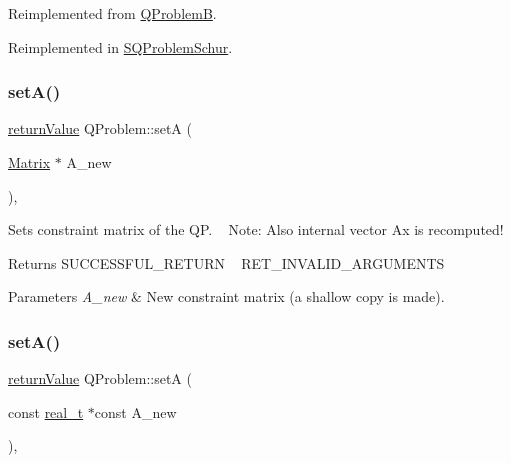 Reimplemented from \hyperlink{class_q_problem_b_a975c13e1a8fbe8c3e9c4dfbce9dc9a71}{Q\+ProblemB}.



Reimplemented in \hyperlink{class_s_q_problem_schur_afe4cfa0c10427b11515ec5a96f883284}{S\+Q\+Problem\+Schur}.

\mbox{\label{class_q_problem_afd392ee6cbfa4dd00d4941c51939e777}} 
\subsubsection{\texorpdfstring{set\+A()}{setA()}\hspace{0.1cm}{\footnotesize\ttfamily [1/2]}}
{\footnotesize\ttfamily \hyperlink{_message_handling_8hpp_a81d556f613bfbabd0b1f9488c0fa865e}{return\+Value} Q\+Problem\+::setA (\begin{DoxyParamCaption}\item[{\hyperlink{class_matrix}{Matrix} $\ast$}]{A\+\_\+new }\end{DoxyParamCaption})\hspace{0.3cm}{\ttfamily [inline]}, {\ttfamily [protected]}}

Sets constraint matrix of the QP. ~\newline
Note\+: Also internal vector Ax is recomputed! \begin{DoxyReturn}{Returns}
S\+U\+C\+C\+E\+S\+S\+F\+U\+L\+\_\+\+R\+E\+T\+U\+RN ~\newline
 R\+E\+T\+\_\+\+I\+N\+V\+A\+L\+I\+D\+\_\+\+A\+R\+G\+U\+M\+E\+N\+TS 
\end{DoxyReturn}

\begin{DoxyParams}{Parameters}
{\em A\+\_\+new} & New constraint matrix (a shallow copy is made). \\
\hline
\end{DoxyParams}
\mbox{\label{class_q_problem_acbbdbe2ce22d9b01dc17aee6e4a19745}} 
\subsubsection{\texorpdfstring{set\+A()}{setA()}\hspace{0.1cm}{\footnotesize\ttfamily [2/2]}}
{\footnotesize\ttfamily \hyperlink{_message_handling_8hpp_a81d556f613bfbabd0b1f9488c0fa865e}{return\+Value} Q\+Problem\+::setA (\begin{DoxyParamCaption}\item[{const \hyperlink{qp_o_a_s_e_s__wrapper_8h_a0d00e2b3dfadee81331bbb39068570c4}{real\+\_\+t} $\ast$const}]{A\+\_\+new }\end{DoxyParamCaption})\hspace{0.3cm}{\ttfamily [inline]}, {\ttfamily [protected]}}

